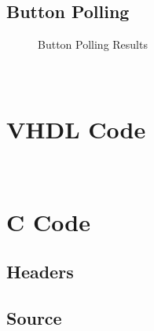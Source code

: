 \documentclass[10pt,a4paper]{article}
\begin{document}
	\subsection{Button Polling}
	\begin{figure}[H]
		\caption{Button Polling Results}
		\label{fig:polling}
	\end{figure}
	\appendix
	\section{\\VHDL Code}
	
	
	\section{\\C Code}
	\subsection{Headers}
	
	
	\subsection{Source}
	
	
	
\end{document}
